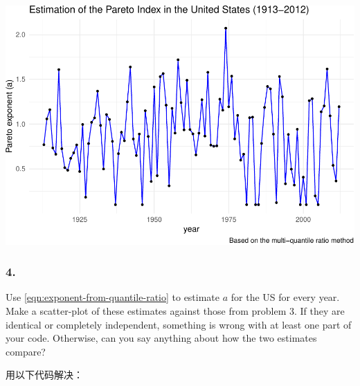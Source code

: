 \documentclass[
]{article}
\begin{document}
\includegraphics{Homework-05_files/figure-latex/unnamed-chunk-3-1.pdf}

\subsubsection{4.}\label{section-3}

Use \eqref{eqn:exponent-from-quantile-ratio} to estimate \(a\) for the
US for every year. Make a scatter-plot of these estimates against those
from problem 3. If they are identical or completely independent,
something is wrong with at least one part of your code. Otherwise, can
you say anything about how the two estimates compare?

用以下代码解决：
\end{document}
